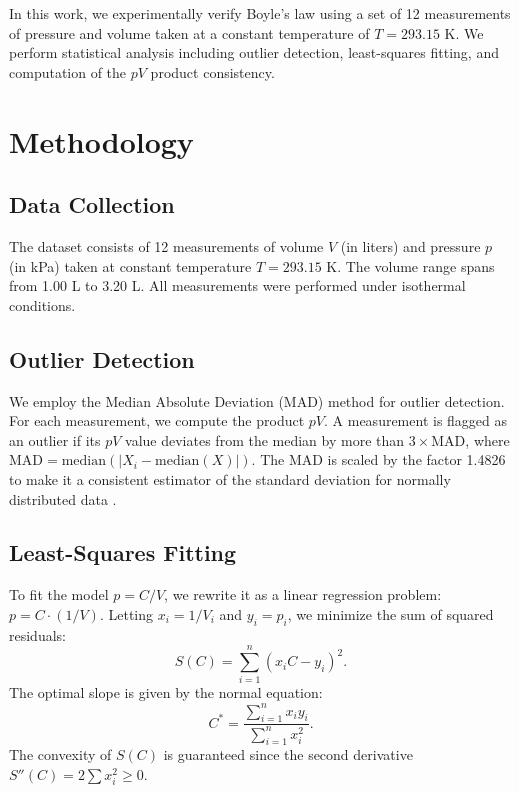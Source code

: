 \documentclass{article}
\theoremstyle{plain}
\theoremstyle{definition}
\theoremstyle{remark}
\begin{document}
In this work, we experimentally verify Boyle's law using a set of 12
measurements of pressure and volume taken at a constant temperature of
$T = 293.15$ K. We perform statistical analysis including outlier detection,
least-squares fitting, and computation of the $pV$ product consistency.

\section{Methodology}

\subsection{Data Collection}

The dataset consists of 12 measurements of volume $V$ (in liters) and pressure
$p$ (in kPa) taken at constant temperature $T = 293.15$ K. The volume range
spans from 1.00 L to 3.20 L. All measurements were performed under isothermal
conditions.

\subsection{Outlier Detection}

We employ the Median Absolute Deviation (MAD) method for outlier detection.
For each measurement, we compute the product $pV$. A measurement is flagged as
an outlier if its $pV$ value deviates from the median by more than
$3 \times \text{MAD}$, where $\text{MAD} = \text{median}(|X_i - \text{median}(X)|)$.
The MAD is scaled by the factor 1.4826 to make it a consistent estimator of
the standard deviation for normally distributed data \cite{Iglewicz1993}.

\subsection{Least-Squares Fitting}

To fit the model $p = C/V$, we rewrite it as a linear regression problem:
$p = C \cdot (1/V)$. Letting $x_i = 1/V_i$ and $y_i = p_i$, we minimize the
sum of squared residuals:
\begin{equation}
  S(C) = \sum_{i=1}^{n} (x_i C - y_i)^2.
\end{equation}
The optimal slope is given by the normal equation:
\begin{equation}
  C^* = \frac{\sum_{i=1}^{n} x_i y_i}{\sum_{i=1}^{n} x_i^2}.
\end{equation}
The convexity of $S(C)$ is guaranteed since the second derivative
$S''(C) = 2\sum x_i^2 \geq 0$.
\end{document}

